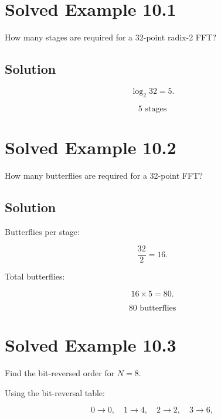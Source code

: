 
\section{Solved Example 10.1}

How many stages are required for a 32-point radix-2 FFT?


\subsection{Solution}

\[
\log_2 32=5.
\]

\[
\boxed{
5\text{ stages}
}
\]


\section{Solved Example 10.2}

How many butterflies are required for a 32-point FFT?


\subsection{Solution}

Butterflies per stage:

\[
\frac{32}{2}=16.
\]

Total butterflies:

\[
16\times5=80.
\]

\[
\boxed{
80\text{ butterflies}
}
\]


\section{Solved Example 10.3}

Find the bit-reversed order for \(N=8\).

Using the bit-reversal table:

\[
0\rightarrow0,
\quad
1\rightarrow4,
\quad
2\rightarrow2,
\quad
3\rightarrow6,
\]


